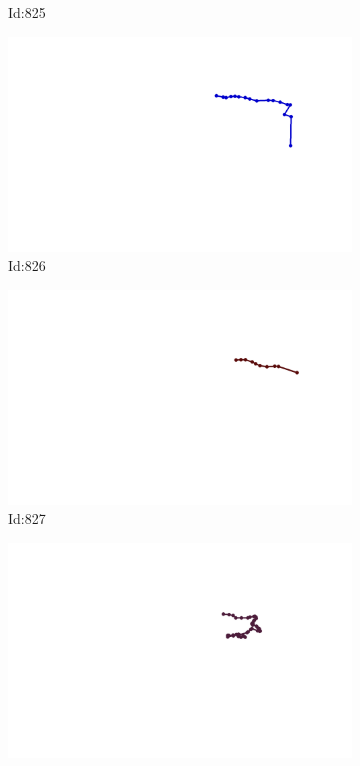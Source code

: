 \documentclass[12pt,twoside]{report}
\begin{document}
\begin{figure}
\begin{subfigure}[b]{0.20\textwidth}
\caption{Id:825}
\end{subfigure}
\begin{subfigure}[b]{0.20\textwidth}
\centering
\includegraphics[width=\textwidth]{../trajectories/826.png}
\caption{Id:826}
\end{subfigure}
\begin{subfigure}[b]{0.20\textwidth}
\centering
\includegraphics[width=\textwidth]{../trajectories/827.png}
\caption{Id:827}
\end{subfigure}
\begin{subfigure}[b]{0.20\textwidth}
\centering
\includegraphics[width=\textwidth]{../trajectories/851.png}

\end{subfigure}
\end{figure}
\end{document}

